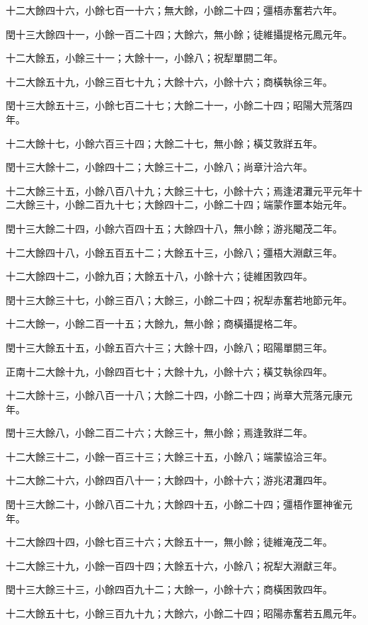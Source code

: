 \begin{pinyinscope}
十二大餘四十六，小餘七百一十六；無大餘，小餘二十四；彊梧赤奮若六年。

閏十三大餘四十一，小餘一百二十四；大餘六，無小餘；徒維攝提格元鳳元年。

十二大餘五，小餘三十一；大餘十一，小餘八；祝犁單閼二年。

十二大餘五十九，小餘三百七十九；大餘十六，小餘十六；商橫執徐三年。

閏十三大餘五十三，小餘七百二十七；大餘二十一，小餘二十四；昭陽大荒落四年。

十二大餘十七，小餘六百三十四；大餘二十七，無小餘；橫艾敦牂五年。

閏十三大餘十二，小餘四十二；大餘三十二，小餘八；尚章汁洽六年。

十二大餘三十五，小餘八百八十九；大餘三十七，小餘十六；焉逢涒灘元平元年十二大餘三十，小餘二百九十七；大餘四十二，小餘二十四；端蒙作噩本始元年。

閏十三大餘二十四，小餘六百四十五；大餘四十八，無小餘；游兆閹茂二年。

十二大餘四十八，小餘五百五十二；大餘五十三，小餘八；彊梧大淵獻三年。

十二大餘四十二，小餘九百；大餘五十八，小餘十六；徒維困敦四年。

閏十三大餘三十七，小餘三百八；大餘三，小餘二十四；祝犁赤奮若地節元年。

十二大餘一，小餘二百一十五；大餘九，無小餘；商橫攝提格二年。

閏十三大餘五十五，小餘五百六十三；大餘十四，小餘八；昭陽單閼三年。

正南十二大餘十九，小餘四百七十；大餘十九，小餘十六；橫艾執徐四年。

十二大餘十三，小餘八百一十八；大餘二十四，小餘二十四；尚章大荒落元康元年。

閏十三大餘八，小餘二百二十六；大餘三十，無小餘；焉逢敦牂二年。

十二大餘三十二，小餘一百三十三；大餘三十五，小餘八；端蒙協洽三年。

十二大餘二十六，小餘四百八十一；大餘四十，小餘十六；游兆涒灘四年。

閏十三大餘二十，小餘八百二十九；大餘四十五，小餘二十四；彊梧作噩神雀元年。

十二大餘四十四，小餘七百三十六；大餘五十一，無小餘；徒維淹茂二年。

十二大餘三十九，小餘一百四十四；大餘五十六，小餘八；祝犁大淵獻三年。

閏十三大餘三十三，小餘四百九十二；大餘一，小餘十六；商橫困敦四年。

十二大餘五十七，小餘三百九十九；大餘六，小餘二十四；昭陽赤奮若五鳳元年。


\end{pinyinscope}
